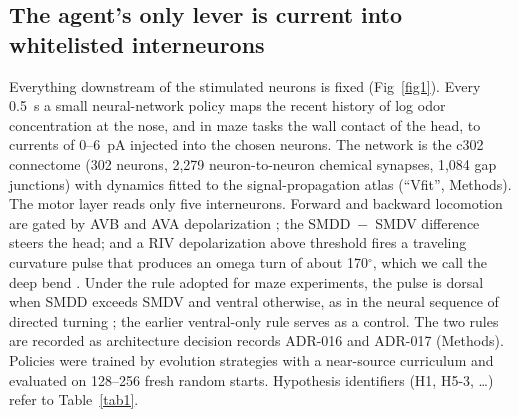 \documentclass[11pt,a4paper]{article}
\begin{document}
\subsection*{The agent's only lever is current into whitelisted interneurons}
Everything downstream of the stimulated neurons is fixed (Fig~\ref{fig1}). Every 0.5~s a small neural-network policy maps the recent history of log odor concentration at the nose, and in maze tasks the wall contact of the head, to currents of 0--6~pA injected into the chosen neurons. The network is the c302 connectome (302 neurons, 2,279 neuron-to-neuron chemical synapses, 1,084 gap junctions) with dynamics fitted to the signal-propagation atlas \cite{r2} (``Vfit'', Methods). The motor layer reads only five interneurons. Forward and backward locomotion are gated by AVB and AVA depolarization \cite{r7}; the SMDD~$-$~SMDV difference steers the head; and a RIV depolarization above threshold fires a traveling curvature pulse that produces an omega turn of about 170$^\circ$, which we call the deep bend \cite{r11}. Under the rule adopted for maze experiments, the pulse is dorsal when SMDD exceeds SMDV and ventral otherwise, as in the neural sequence of directed turning \cite{r11}; the earlier ventral-only rule serves as a control. The two rules are recorded as architecture decision records ADR-016 and ADR-017 (Methods). Policies were trained by evolution strategies with a near-source curriculum and evaluated on 128--256 fresh random starts. Hypothesis identifiers (H1, H5-3, \ldots) refer to Table~\ref{tab1}.
\end{document}
